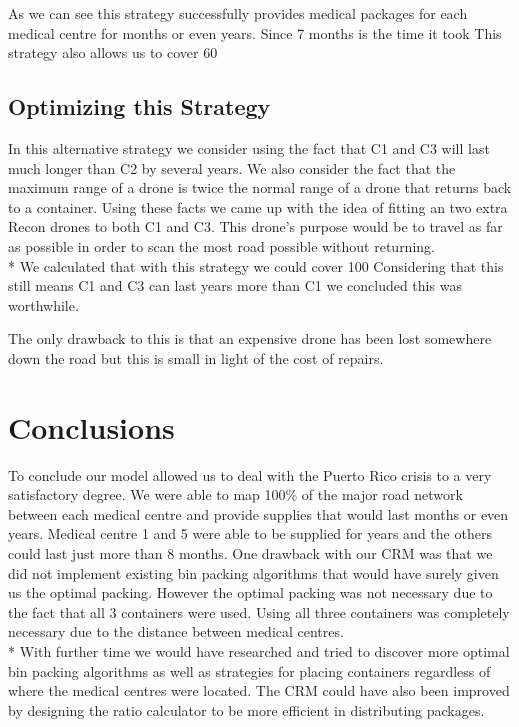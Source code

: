 \documentclass[a4paper,12pt]{article}
\begin{document}
As we can see this strategy successfully provides medical packages for each medical centre for months or even years. Since 7 months is the time it took
This strategy also allows us to cover 60%

\subsection{Optimizing this Strategy}
In this alternative strategy we consider using the fact that C1 and C3 will last much longer than C2 by several years.
We also consider the fact that the maximum range of a drone is twice the normal range of a drone that returns back to a container.
Using these facts we came up with the idea of fitting an two extra Recon drones to both C1 and C3. This drone's purpose would be to travel as far as possible
in order to scan the most road possible without returning.\\*
We calculated that with this strategy we could cover 100%
Considering that this still means C1 and C3 can last years more than C1 we concluded this was worthwhile.

The only drawback to this is that an expensive drone has been lost somewhere down the road but this is small in light of the cost of repairs.



\newpage

\section{Conclusions}
To conclude our model allowed us to deal with the Puerto Rico crisis to a very satisfactory degree. We were able to map 100\% of the major road network between each medical centre and provide supplies that would last
months or even years. Medical centre 1 and 5 were able to be supplied for years and the others could last just more than 8 months.
One drawback with our CRM was that we did not implement existing bin packing algorithms that would have surely given us the optimal packing. However the optimal packing was not necessary due to the fact that all 3 containers were used.
Using all three containers was completely necessary due to the distance between medical centres. \\*
With further time we would have researched and tried to discover more optimal bin packing algorithms as well as strategies for placing containers regardless of where the medical
centres were located. The CRM could have also been improved by designing the ratio calculator to be more efficient in distributing packages.
\end{document}
